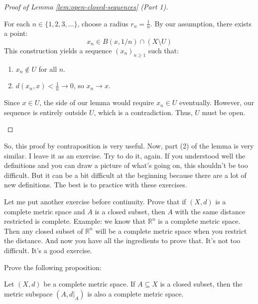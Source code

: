 \begin{proof}[Proof of Lemma \ref{lem:open-closed-sequences} (Part 1)]
\begin{math-stroke}
For each $n \in \{1, 2, 3, \dots\}$, choose a radius $r_n = \frac{1}{n}$. By our assumption, there exists a point:
\[ x_n \in B(x, 1/n) \cap (X \setminus U) \]
This construction yields a sequence $(x_n)_{n \ge 1}$ such that:
\begin{enumerate}
    \setcounter{enumi}{0} \item $x_n \notin U$ for all $n$.
    \item $d(x_n, x) < \frac{1}{n} \to 0$, so $x_n \to x$.
\end{enumerate}
Since $x \in U$, the  side of our lemma would require $x_n \in U$ eventually. However, our sequence is entirely outside $U$, which is a contradiction. Thus, $U$ must be open.
\end{math-stroke}
\end{proof}

\begin{spoken-clean}[00:21:15 - 00:24:04]
So, this proof by contraposition is very useful. Now, part (2) of the lemma is very similar. I leave it as an exercise. Try to do it, again. If you understood well the definitions and you can draw a picture of what's going on, this shouldn't be too difficult. But it can be a bit difficult at the beginning because there are a lot of new definitions. The best is to practice with these exercises. 

Let me put another exercise before continuity. Prove that if $(X, d)$ is a complete metric space and $A$ is a closed subset, then $A$ with the same distance restricted is complete. Example: we know that $\mathbb{R}^n$ is a complete metric space. Then any closed subset of $\mathbb{R}^n$ will be a complete metric space when you restrict the distance. And now you have all the ingredients to prove that. It's not too difficult. It's a good exercise.
\end{spoken-clean}

\begin{math-stroke}
\begin{nice-box}[Exercise]
Prove the following proposition:
\begin{proposition}\label{prop:closed-subset-complete}
Let $(X, d)$ be a complete metric space. If $A \subseteq X$ is a closed subset, then the metric subspace $(A, d|_A)$ is also a complete metric space.
\end{proposition}
\end{nice-box}
\end{math-stroke}

